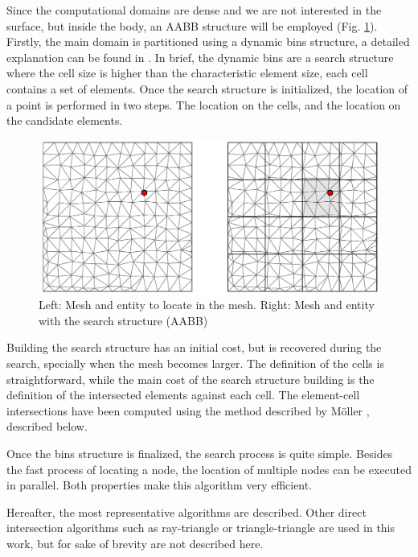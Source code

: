 Since the computational domains are dense and we are not interested in the surface, but inside the body, an AABB structure will be employed (Fig. \ref{bins_search}).
Firstly, the main domain is partitioned using a dynamic bins structure, a detailed explanation can be found in \cite{samet1984}. In brief, the dynamic bins are a search structure where the cell size is higher than the characteristic element size, each cell contains a set of elements. Once the search structure is initialized, the location of a point is performed in two steps. The location on the cells, and the location on the candidate elements.

\begin{figure}[htb]
    \centering
    \includegraphics[width=.9\textwidth]{img/search/bins_search.pdf}
    \caption{Left: Mesh and entity to locate in the mesh. Right: Mesh and entity with the search structure (AABB)}
    \label{bins_search}
\end{figure}

Building the search structure has an initial cost, but is recovered during the search, specially when the mesh becomes larger. The definition of the cells is straightforward, while the main cost of the search structure building is the definition of the intersected elements against each cell. The element-cell intersections have been computed using the method described by Möller \cite{mollerakenine2004}, described below.

Once the bins structure is finalized, the search process is quite simple. Besides the fast process of locating a node, the location of multiple nodes can be executed in parallel. Both properties make this algorithm very efficient.

Hereafter, the most representative algorithms are described. Other direct intersection algorithms such as ray-triangle \cite{moller1997, jimenez2014} or triangle-triangle \cite{moller1997tritri} are used in this work, but for sake of brevity are not described here.




